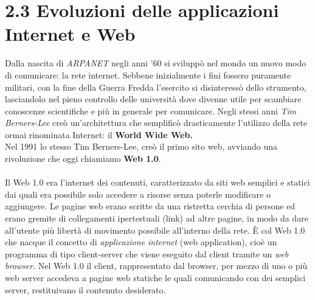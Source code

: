 \documentclass[a4paper, 11pt, oneside]{book}
\theoremstyle{plain}
\begin{document}
\section*{2.3 Evoluzioni delle applicazioni Internet e Web}
Dalla nascita di \textit{ARPANET} negli anni '60 si sviluppò nel mondo un nuovo modo di comunicare: la rete internet. Sebbene inizialmente i fini fossero puramente militari, con la fine della Guerra Fredda l'esercito si disinteressò dello strumento, lasciandolo nel pieno controllo delle università dove divenne utile per scambiare conoscenze scientifiche e più in generale per comunicare. Negli stessi anni \textit{Tim Berners-Lee} creò un'architettura che semplificò drasticamente l'utilizzo della rete ormai rinominata Internet: il \textbf{World Wide Web.}\\Nel 1991 lo stesso Tim Berners-Lee, creò il primo sito web, avviando una rivoluzione che oggi chiamiamo \textbf{Web 1.0}.\\\\
Il Web 1.0 era l'internet dei contenuti, caratterizzato da siti web semplici e statici dai quali era possibile solo accedere a risorse senza poterle modificare o aggiungere. Le pagine web erano scritte da una ristretta cerchia di persone ed erano gremite di collegamenti ipertestuali (link) ad altre pagine, in modo da dare all'utente più libertà di movimento possibile all'interno della rete. È col Web 1.0 che nacque il concetto di \textit{applicazione internet} (web application), cioè un programma di tipo client-server che viene eseguito dal client tramite un \textit{web browser}. Nel Web 1.0 il client, rappresentato dal browser, per mezzo di uno o più web server accedeva a pagine web statiche le quali comunicando con dei semplici server, restituivano il contenuto desiderato.
\end{document}
